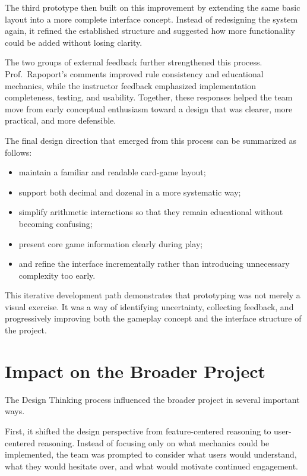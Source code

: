 \documentclass[12pt]{article}
\begin{document}
    The third prototype then built on this improvement by extending the same basic layout into a more complete interface concept. Instead of redesigning the system again, it refined the established structure and suggested how more functionality could be added without losing clarity.

    The two groups of external feedback further strengthened this process. Prof.\ Rapoport's comments improved rule consistency and educational mechanics, while the instructor feedback emphasized implementation completeness, testing, and usability. Together, these responses helped the team move from early conceptual enthusiasm toward a design that was clearer, more practical, and more defensible.

    The final design direction that emerged from this process can be summarized as follows:

    \begin{itemize}
        \item maintain a familiar and readable card-game layout;
        \item support both decimal and dozenal in a more systematic way;
        \item simplify arithmetic interactions so that they remain educational without becoming confusing;
        \item present core game information clearly during play;
        \item and refine the interface incrementally rather than introducing unnecessary complexity too early.
    \end{itemize}

    This iterative development path demonstrates that prototyping was not merely a visual exercise. It was a way of identifying uncertainty, collecting feedback, and progressively improving both the gameplay concept and the interface structure of the project.

    \section{Impact on the Broader Project}

    The Design Thinking process influenced the broader project in several important ways.

    First, it shifted the design perspective from feature-centered reasoning to user-centered reasoning. Instead of focusing only on what mechanics could be implemented, the team was prompted to consider what users would understand, what they would hesitate over, and what would motivate continued engagement.
\end{document}
